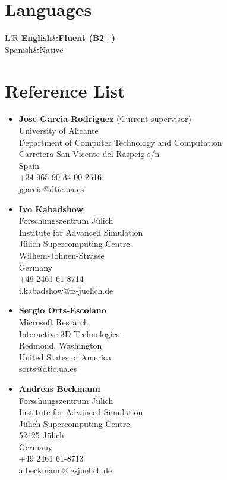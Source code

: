 \documentclass[8pt]{article}
\newcommand\VRule{\color{lightgray}\vrule width 0.5pt}
\begin{document}
\section*{Languages}
\begin{tabular}{L!{\VRule}R}
{\bf English}&{\bf Fluent (B2+)}\\
{Spanish}&{Native}\\
\end{tabular}

\section*{Reference List}
\begin{itemize}
	\item {\textbf{Jose Garcia-Rodriguez} (Current supervisor)\\
    University of Alicante\\
    Department of Computer Technology and Computation\\
    Carretera San Vicente del Raspeig s/n\\
    Spain\\
    +34 965 90 34 00-2616\\
    jgarcia@dtic.ua.es\\}
  \item {\textbf{Ivo Kabadshow}\\
    Forschungszentrum Jülich\\
    Institute for Advanced Simulation\\
    Jülich Supercomputing Centre\\
    Wilhem-Johnen-Strasse\\
    Germany\\
    +49 2461 61-8714\\
    i.kabadshow@fz-juelich.de\\}
	\item {\textbf{Sergio Orts-Escolano}\\
		Microsoft Research\\
		Interactive 3D Technologies\\
		Redmond, Washington\\
		United States of America\\
		sorts@dtic.ua.es\\}
  \item {\textbf{Andreas Beckmann}\\
    Forschungszentrum Jülich\\
    Institute for Advanced Simulation\\
    Jülich Supercomputing Centre\\
    52425 Jülich\\
    Germany\\
    +49 2461 61-8713\\
    a.beckmann@fz-juelich.de\\}

\end{itemize}
 
\end{document}
